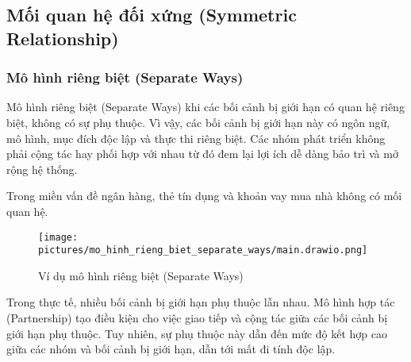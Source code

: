 






\subsection{Mối quan hệ đối xứng (Symmetric Relationship)}


\subsubsection{Mô hình riêng biệt (Separate Ways)}

Mô hình riêng biệt (Separate Ways) khi các bối cảnh bị giới hạn có quan hệ riêng biệt, không có sự phụ thuộc. Vì vậy, các bối cảnh bị giới hạn này có ngôn ngữ, mô hình, mục đích độc lập và thực thi riêng biệt. Các nhóm phát triển không phải cộng tác hay phối hợp với nhau từ đó đem lại lợi ích dễ dàng bảo trì và mở rộng hệ thống.

\begin{example} Trong miền vấn đề ngân hàng, thẻ tín dụng và khoản vay mua nhà không có mối quan hệ.

\begin{figure}[H]

\centering

\texttt{[image: pictures/mo\_hinh\_rieng\_biet\_separate\_ways/main.drawio.png]}

\caption{Ví dụ mô hình riêng biệt (Separate Ways)}

\end{figure}

\end{example}


Trong thực tế, nhiều bối cảnh bị giới hạn phụ thuộc lẫn nhau. Mô hình hợp tác (Partnership) tạo điều kiện cho việc giao tiếp và cộng tác giữa các bối cảnh bị giới hạn phụ thuộc. Tuy nhiên, sự phụ thuộc này dẫn đến mức độ kết hợp cao giữa các nhóm và bối cảnh bị giới hạn, dẫn tới mất đi tính độc lập.

